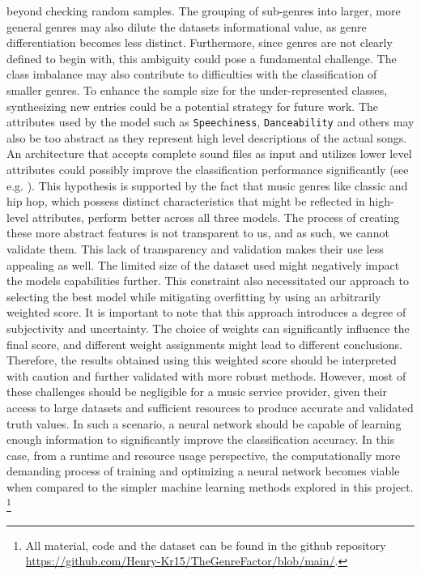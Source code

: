 \documentclass[
  12pt,
  bibliography=totoc,     %
  captions=tableheading,  %
  titlepage=firstiscover, %
]{scrartcl}
\begin{document}
beyond checking random samples.
The grouping of sub-genres into larger, more general genres may also dilute the datasets informational value, as genre differentiation becomes less distinct.
Furthermore, since genres are not clearly defined to begin with, this ambiguity could pose a fundamental challenge.
The class imbalance may also contribute to difficulties with the classification of smaller genres.
To enhance the sample size for the under-represented classes, synthesizing new entries could be a potential strategy for future work.
The attributes used by the model such as \texttt{Speechiness}, \texttt{Danceability} and others may also be too abstract as they represent high level descriptions
of the actual songs. An architecture that accepts complete sound files as input and utilizes lower level attributes could possibly improve the classification
performance significantly (see e.g. \cite{Übersicht2011}). This hypothesis is supported by the fact that music genres like classic and hip hop, which possess distinct
characteristics that might be reflected in high-level attributes, perform better across all three models.
The process of creating these more abstract features is not transparent to us, and as such, we cannot validate them. This lack of transparency and validation makes their use
less appealing as well.
The limited size of the dataset used might negatively impact the models capabilities further. This constraint also necessitated our approach to selecting the best model while
mitigating overfitting by using an arbitrarily weighted score. It is important to note that this approach introduces a degree of subjectivity and uncertainty. The choice of
weights can significantly influence the final score, and different weight assignments might lead to different conclusions. Therefore, the results obtained using this weighted
score should be interpreted with caution and further validated with more robust methods.
However, most of these challenges should be negligible for a music service provider, given their access to large datasets and sufficient resources to produce accurate and
validated truth values. In such a scenario, a neural network should be capable of learning enough information to significantly improve the classification accuracy. In this
case, from a runtime and resource usage perspective, the computationally more demanding process of training and optimizing a neural network becomes viable when compared to
the simpler machine learning methods explored in this project.
\footnote{All material, code and the dataset can be found in the github repository \url{https://github.com/Henry-Kr15/TheGenreFactor/blob/main/}.}
\newpage
\printbibliography
\end{document}
